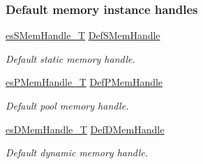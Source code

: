 \subsubsection*{Default memory instance handles}
\begin{DoxyCompactItemize}
\item 
\hyperlink{group__mem__intf_gabf19a317cc22713cfb45ae1e43d34d7e}{es\-S\-Mem\-Handle\-\_\-\-T} \hyperlink{group__mem__intf_ga59214c7e13470c5e76c7b59c4f084b1c}{Def\-S\-Mem\-Handle}
\begin{DoxyCompactList}\small\item\em Default static memory handle. \end{DoxyCompactList}\item 
\hyperlink{group__mem__intf_gaf82f01d26c4f6bc9a2b672a673b09ce2}{es\-P\-Mem\-Handle\-\_\-\-T} \hyperlink{group__mem__intf_gafb0dc701e9679157a617a091843bcd7f}{Def\-P\-Mem\-Handle}
\begin{DoxyCompactList}\small\item\em Default pool memory handle. \end{DoxyCompactList}\item 
\hyperlink{group__mem__intf_gacaaf771b18b3da8fa3b67a466390080e}{es\-D\-Mem\-Handle\-\_\-\-T} \hyperlink{group__mem__intf_gae2d3f8ca3b99ba0a5b9d9518a7bc280b}{Def\-D\-Mem\-Handle}
\begin{DoxyCompactList}\small\item\em Default dynamic memory handle. \end{DoxyCompactList}\end{DoxyCompactItemize}
